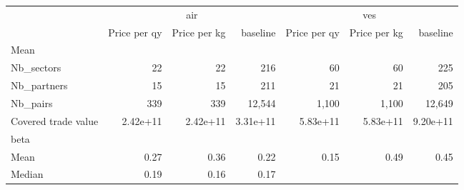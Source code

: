 \begin{tabular}{lllllll}
\cline{1-7}
\multicolumn{1}{c}{} &
  \multicolumn{3}{|c}{air} &
  \multicolumn{3}{c}{ves} \\
\multicolumn{1}{c}{} &
  \multicolumn{1}{|r}{Price per qy} &
  \multicolumn{1}{r}{Price per kg} &
  \multicolumn{1}{r}{baseline} &
  \multicolumn{1}{r}{Price per qy} &
  \multicolumn{1}{r}{Price per kg} &
  \multicolumn{1}{r}{baseline} \\
\cline{1-7}
\multicolumn{1}{l}{Mean} &
  \multicolumn{1}{|r}{} &
  \multicolumn{1}{r}{} &
  \multicolumn{1}{r}{} &
  \multicolumn{1}{r}{} &
  \multicolumn{1}{r}{} &
  \multicolumn{1}{r}{} \\
\multicolumn{1}{l}{\hspace{1em}Nb\_sectors} &
  \multicolumn{1}{|r}{22} &
  \multicolumn{1}{r}{22} &
  \multicolumn{1}{r}{216} &
  \multicolumn{1}{r}{60} &
  \multicolumn{1}{r}{60} &
  \multicolumn{1}{r}{225} \\
\multicolumn{1}{l}{\hspace{1em}Nb\_partners} &
  \multicolumn{1}{|r}{15} &
  \multicolumn{1}{r}{15} &
  \multicolumn{1}{r}{211} &
  \multicolumn{1}{r}{21} &
  \multicolumn{1}{r}{21} &
  \multicolumn{1}{r}{205} \\
\multicolumn{1}{l}{\hspace{1em}Nb\_pairs} &
  \multicolumn{1}{|r}{339} &
  \multicolumn{1}{r}{339} &
  \multicolumn{1}{r}{12,544} &
  \multicolumn{1}{r}{1,100} &
  \multicolumn{1}{r}{1,100} &
  \multicolumn{1}{r}{12,649} \\
\multicolumn{1}{l}{\hspace{1em}Covered trade value} &
  \multicolumn{1}{|r}{2.42e+11} &
  \multicolumn{1}{r}{2.42e+11} &
  \multicolumn{1}{r}{3.31e+11} &
  \multicolumn{1}{r}{5.83e+11} &
  \multicolumn{1}{r}{5.83e+11} &
  \multicolumn{1}{r}{9.20e+11} \\
\multicolumn{1}{l}{beta} &
  \multicolumn{1}{|r}{} &
  \multicolumn{1}{r}{} &
  \multicolumn{1}{r}{} &
  \multicolumn{1}{r}{} &
  \multicolumn{1}{r}{} &
  \multicolumn{1}{r}{} \\
\multicolumn{1}{l}{\hspace{1em}Mean} &
  \multicolumn{1}{|r}{0.27} &
  \multicolumn{1}{r}{0.36} &
  \multicolumn{1}{r}{0.22} &
  \multicolumn{1}{r}{0.15} &
  \multicolumn{1}{r}{0.49} &
  \multicolumn{1}{r}{0.45} \\
\multicolumn{1}{l}{\hspace{1em}Median} &
  \multicolumn{1}{|r}{0.19} &
  \multicolumn{1}{r}{0.16} &
  \multicolumn{1}{r}{0.17} &

\end{tabular}
